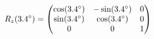 \documentclass[preview]{standalone}
\begin{document}
\begin{align*}
\special{dvisvgm:raw <g id='unique000'>}R_z(3.4^\circ) = \begin{pmatrix} \cos(3.4^\circ) & -\sin(3.4^\circ) & 0 \\ \sin(3.4^\circ) & \cos(3.4^\circ) & 0 \\ 0 & 0 & 1 \end{pmatrix}\special{dvisvgm:raw </g>}
\end{align*}
\end{document}
